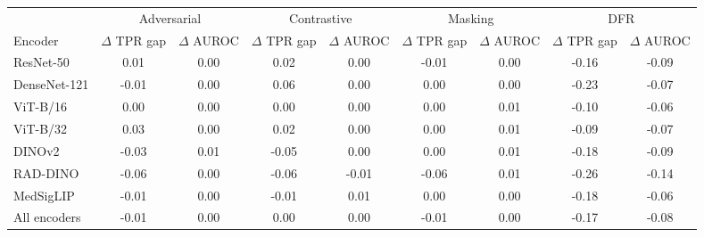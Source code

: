 \begin{tabular}{lcccccccc}
\toprule
 & \multicolumn{2}{c}{Adversarial} & \multicolumn{2}{c}{Contrastive} & \multicolumn{2}{c}{Masking} & \multicolumn{2}{c}{DFR} \\
\cmidrule(lr){2-3} \cmidrule(lr){4-5} \cmidrule(lr){6-7} \cmidrule(lr){8-9}
Encoder & $\Delta$ TPR gap & $\Delta$ AUROC & $\Delta$ TPR gap & $\Delta$ AUROC & $\Delta$ TPR gap & $\Delta$ AUROC & $\Delta$ TPR gap & $\Delta$ AUROC \\
\midrule
ResNet-50 & 0.01 & 0.00 & 0.02 & 0.00 & -0.01 & 0.00 & -0.16 & -0.09 \\
DenseNet-121 & -0.01 & 0.00 & 0.06 & 0.00 & 0.00 & 0.00 & -0.23 & -0.07 \\
ViT-B/16 & 0.00 & 0.00 & 0.00 & 0.00 & 0.00 & 0.01 & -0.10 & -0.06 \\
ViT-B/32 & 0.03 & 0.00 & 0.02 & 0.00 & 0.00 & 0.01 & -0.09 & -0.07 \\
DINOv2 & -0.03 & 0.01 & -0.05 & 0.00 & 0.00 & 0.01 & -0.18 & -0.09 \\
RAD-DINO & -0.06 & 0.00 & -0.06 & -0.01 & -0.06 & 0.01 & -0.26 & -0.14 \\
MedSigLIP & -0.01 & 0.00 & -0.01 & 0.01 & 0.00 & 0.00 & -0.18 & -0.06 \\
\midrule
All encoders & -0.01 & 0.00 & 0.00 & 0.00 & -0.01 & 0.00 & -0.17 & -0.08 \\
\bottomrule
\end{tabular}
